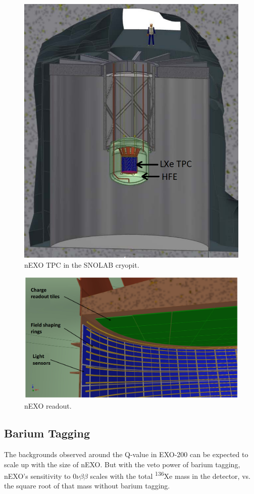 \begin{figure} %
	\centering
	\includegraphics[width=.7\textwidth]{figures/nEXO_cryopit.png}
	\caption{nEXO TPC in the SNOLAB cryopit.}
\label{fig:nEXO_cryopit}
\end{figure}

\begin{figure} %
	\centering
	\includegraphics[width=.7\textwidth]{figures/nEXO_readout.png}
	\caption{nEXO readout.}
\label{fig:nEXO_readout}
\end{figure}

\subsection{Barium Tagging}

The backgrounds observed around the Q-value in EXO-200 can be expected to scale up with the size of nEXO.  But with the veto power of barium tagging, nEXO's sensitivity to $0\nu\beta\beta$ scales with the total \textsuperscript{136}Xe mass in the detector, vs. the square root of that mass without barium tagging.

